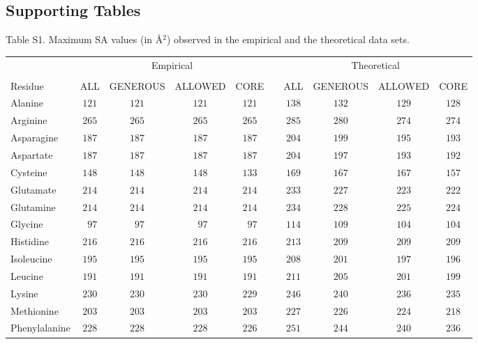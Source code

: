 \documentclass[12pt]{article}
\begin{document}
\newpage


\subsection*{Supporting Tables}



\noindent Table S1. Maximum SA values (in \AA$^2$) observed in the empirical and the theoretical data sets.

\begin{center}
\scriptsize
\begin{tabular}{lccccccccc}
 & \multicolumn{4}{c}{Empirical} &&\multicolumn{4}{c}{Theoretical}\\\cline{2-5}\cline{7-10}\\[-1.6ex]
Residue          & ALL & GENEROUS & ALLOWED & CORE & & ALL & GENEROUS & ALLOWED & CORE\\
\hline Alanine   & $121$ & $121$ & $121$ & $121$ & & $138$ & $132$ & $129$ & $128$\\
Arginine         & $265$ & $265$ & $265$ & $265$ & & $285$ & $280$ & $274$ & $274$\\
Asparagine       & $187$ & $187$ & $187$ & $187$ & & $204$ & $199$ & $195$ & $193$\\
Aspartate        & $187$ & $187$ & $187$ & $187$ & & $204$ & $197$ & $193$ & $192$\\
Cysteine         & $148$ & $148$ & $148$ & $133$ & & $169$ & $167$ & $167$ & $157$\\
Glutamate        & $214$ & $214$ & $214$ & $214$ & & $233$ & $227$ & $223$ & $222$\\
Glutamine        & $214$ & $214$ & $214$ & $214$ & & $234$ & $228$ & $225$ & $224$\\
Glycine          & $\phantom{0}97$ & $\phantom{0}97$ & $\phantom{0}97$ & $\phantom{0}97$ & & $114$ & $109$ & $104$ & $104$\\
Histidine        & $216$ & $216$ & $216$ & $216$ & & $213$ & $209$ & $209$ & $209$\\
Isoleucine       & $195$ & $195$ & $195$ & $195$ & & $208$ & $201$ & $197$ & $196$\\
Leucine          & $191$ & $191$ & $191$ & $191$ & & $211$ & $205$ & $201$ & $199$\\
Lysine           & $230$ & $230$ & $230$ & $229$ & & $246$ & $240$ & $236$ & $235$\\
Methionine       & $203$ & $203$ & $203$ & $203$ & & $227$ & $226$ & $224$ & $218$\\
Phenylalanine    & $228$ & $228$ & $228$ & $226$ & & $251$ & $244$ & $240$ & $236$\\

\end{tabular}
\end{center}
\end{document}
